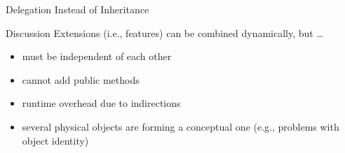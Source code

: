 \begin{frame}{Delegation Instead of Inheritance}
	\begin{mycolumns}[widths={55}]
		\begin{note}{Discussion}
			Extensions (i.e., features) can be combined dynamically, but \ldots
			\begin{itemize}
				\item must be independent of each other
				\item cannot add public methods
				\item runtime overhead due to indirections
				\item several physical objects are forming a conceptual one (e.g., problems with object identity)
			\end{itemize}
		\end{note}
	\mynextcolumn
	\end{mycolumns}
\end{frame}
